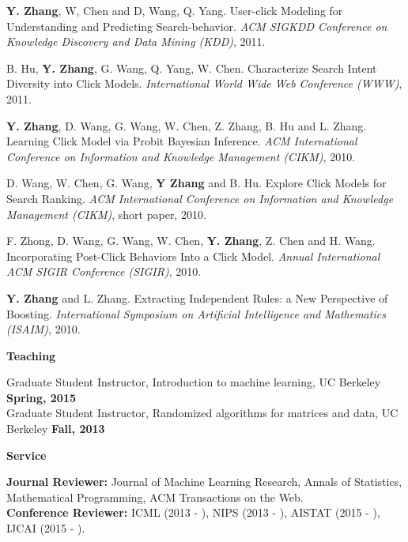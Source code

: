 \documentclass{res} %
\begin{document}
\begin{resume}
\begin{enumerate}[label={[C\arabic*]}, ref={C\arabic*}]
\item  \textbf{Y. Zhang}, W, Chen and D, Wang, Q. Yang. User-click Modeling for Understanding and Predicting Search-behavior.
\emph{ACM SIGKDD Conference on Knowledge Discovery and Data Mining (KDD)}, 2011.\label{user-kdd11}
\item B. Hu, \textbf{Y. Zhang}, G. Wang, Q. Yang, W. Chen. Characterize Search Intent Diversity into Click Models.
\emph{International World Wide Web Conference (WWW)}, 2011. \label{characterize-www11}

\item \textbf{Y. Zhang}, D. Wang, G. Wang, W. Chen, Z. Zhang, B. Hu and L. Zhang. Learning Click Model via Probit Bayesian Inference.
\emph{ACM International Conference on Information and Knowledge Management (CIKM)}, 2010. \label{learning-cikm10}

\item D. Wang, W. Chen, G. Wang, \textbf{Y Zhang} and B. Hu. Explore Click Models for Search Ranking.
\emph{ACM International Conference on Information and Knowledge Management (CIKM)}, short paper, 2010. \label{explore-cikm10}

\item F. Zhong, D. Wang, G. Wang, W. Chen, \textbf{Y. Zhang}, Z. Chen and H. Wang. Incorporating Post-Click Behaviors Into a Click Model.
\emph{Annual International ACM SIGIR Conference (SIGIR)}, 2010. \label{incorporating-sigir10}

\item \textbf{Y. Zhang} and L. Zhang. Extracting Independent Rules: a New Perspective of Boosting. 
\emph{International Symposium on Artificial Intelligence and Mathematics (ISAIM)}, 2010. \label{a-new-isaim10}
\end{enumerate}

{\Large\bf Teaching}

\vspace{-5pt}
Graduate Student Instructor, Introduction to machine learning, UC Berkeley \hfill\textbf{Spring, 2015}\\
Graduate Student Instructor, Randomized algorithms for matrices and data, UC Berkeley \hfill\textbf{Fall, 2013}

{\Large\bf Service}

\vspace{-5pt}
{\bf Journal Reviewer:} Journal of Machine Learning Research, Annals of Statistics, Mathematical Programming, ACM Transactions on the Web. \\
{\bf Conference Reviewer:} ICML (2013 - ), NIPS (2013 - ), AISTAT (2015 - ), IJCAI (2015 - ).


\end{resume}
\end{document}
